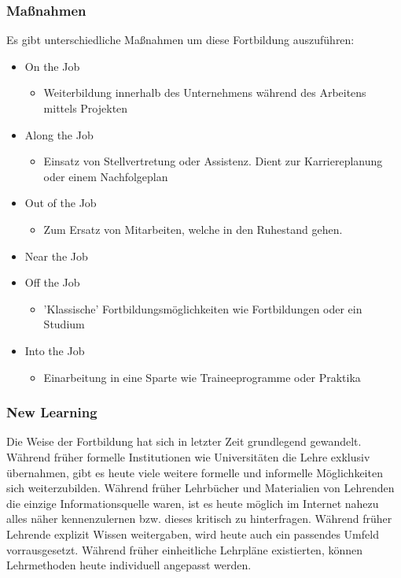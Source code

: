 \documentclass{article}
\begin{document}
	 \subsubsection{Maßnahmen}
	 Es gibt unterschiedliche Maßnahmen um diese Fortbildung auszuführen:
	 \begin{itemize}
	 	\item{On the Job}
	 	\begin{itemize}
	 		\item{Weiterbildung innerhalb des Unternehmens während des Arbeitens mittels Projekten}
	 	\end{itemize}
	 	\item{Along the Job}
	 	\begin{itemize}
	 		\item{Einsatz von Stellvertretung oder Assistenz. Dient zur Karriereplanung oder einem Nachfolgeplan}
	 	\end{itemize}
	 	\item{Out of the Job}
	 	\begin{itemize}
	 		\item{Zum Ersatz von Mitarbeiten, welche in den Ruhestand gehen.}
	 	\end{itemize}
	 	\item{Near the Job}
	 	\item{Off the Job}
	 	\begin{itemize}
	 		\item{'Klassische' Fortbildungsmöglichkeiten wie Fortbildungen oder ein Studium}
	 	\end{itemize}
	 	\item{Into the Job}
	 	\begin{itemize}
	 		\item{Einarbeitung in eine Sparte wie Traineeprogramme oder Praktika}
	 	\end{itemize}
	 \end{itemize}
	 \subsubsection{New Learning}
	 Die Weise der Fortbildung hat sich in letzter Zeit grundlegend gewandelt. Während früher formelle Institutionen wie Universitäten die Lehre exklusiv übernahmen, gibt es heute viele weitere formelle und informelle Möglichkeiten sich weiterzubilden. Während früher Lehrbücher und Materialien von Lehrenden die einzige Informationsquelle waren, ist es heute möglich im Internet nahezu alles näher kennenzulernen bzw. dieses kritisch zu hinterfragen. Während früher Lehrende explizit Wissen weitergaben, wird heute auch ein passendes Umfeld vorrausgesetzt. Während früher einheitliche Lehrpläne existierten, können Lehrmethoden heute individuell angepasst werden.
\end{document}
